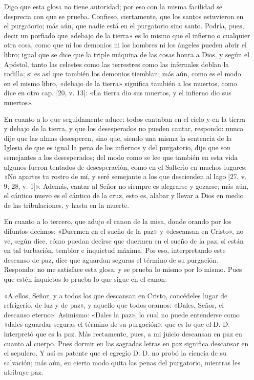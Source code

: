 Digo que esta glosa no tiene autoridad; por eso con la misma facilidad se desprecia con que se prueba. Confieso, ciertamente, que los santos estuvieron en el purgatorio; más aún, que nadie está en el purgatorio sino santo. Podría, pues, decir un porfiado que «debajo de la tierra» es lo mismo que el infierno o cualquier otra cosa, como que ni los demonios ni los hombres ni los ángeles pueden abrir el libro; igual que se dice que la triple máquina de las cosas honra a Dios, y según el Apóstol, tanto las celestes como las terrestres como las infernales doblan la rodilla; si es así que también los demonios tiemblan; más aún, como es el modo en el mismo libro, «debajo de la tierra» significa también a los muertos, como dice en otro cap. [20, v. 13]: «La tierra dio sus muertos, y el infierno dio sus muertos».

En cuanto a lo que seguidamente aduce: todos cantaban en el cielo y en la tierra y debajo de la tierra, y que los desesperados no pueden cantar, respondo: nunca dije que las almas desesperen, sino que, siendo una misma la sentencia de la Iglesia de que es igual la pena de los infiernos y del purgatorio, dije que son semejantes a los desesperados; del modo como se lee que también en esta vida algunos fueron tentados de desesperación, como en el Salterio en muchos lugares: «No apartes tu rostro de mí, y seré semejante a los que descienden al lago [27, v. 9; 28, v. 1]». Además, cantar al Señor no siempre es alegrarse y gozarse; más aún, el cántico nuevo es el cántico de la cruz, esto es, alabar y llevar a Dios en medio de las tribulaciones, y hasta en la muerte.

En cuanto a lo tercero, que adujo el canon de la misa, donde orando por los difuntos decimos: «Duermen en el sueño de la paz» y «descansan en Cristo», no ve, según dice, cómo puedan decirse que duermen en el sueño de la paz, si están en tal turbación, temblor e inquietud máxima. Por eso, interpretando este descanso de paz, dice que aguardan seguras el término de su purgación. Respondo: no me satisface esta glosa, y se prueba lo mismo por lo mismo. Pues que estén inquietos lo prueba lo que sigue en el canon:

«A ellos, Señor, y a todos los que descansan en Cristo, concédeles lugar de refrigerio, de luz y de paz», y aquello que todos oramos: «Dales, Señor, el descanso eterno». Asimismo: «Dales la paz», lo cual no puede entenderse como «dales aguardar seguras el término de su purgación», que es lo que el D. D. interpretó que es la paz. Más rectamente, pues, a mi juicio descansan en paz en cuanto al cuerpo. Pues dormir en las sagradas letras en paz significa descansar en el sepulcro. \marginpar{\small[334]} Y así es patente que el egregio D. D. no probó la ciencia de su salvación; más aún, en cierto modo quita las penas del purgatorio, mientras les atribuye paz.


